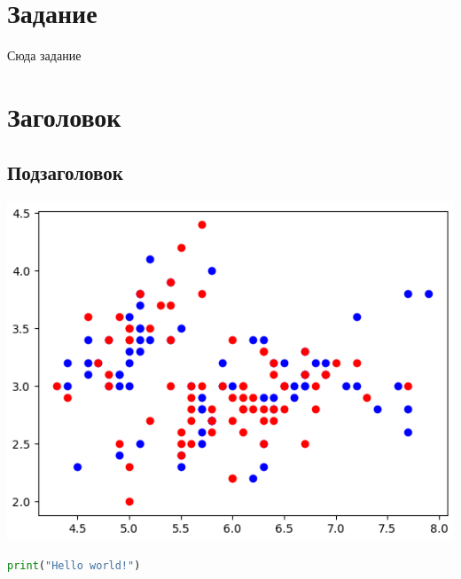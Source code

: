\documentclass[a4paper, 12pt]{article}
\begin{document}

\pagebreak
\tableofcontents
\newpage
\section*{Задание}
Сюда задание
\newpage
\section{Заголовок}
\subsection{Подзаголовок}
\begin{center}
    \centering
    \includegraphics[width=.7\linewidth]{includes/output.png}
    \label{fig:prplot}
\end{center}
\begin{lstlisting}[language=Python, caption=листинг]
    print("Hello world!")
\end{lstlisting}


\end{document}

